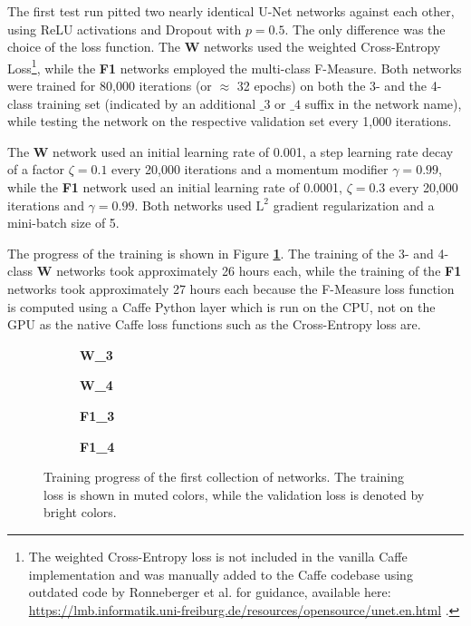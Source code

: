\noindent The first test run pitted two nearly identical U-Net networks against each other, using ReLU activations and Dropout with $p = 0.5$. The only difference was the choice of the loss function. The \textbf{W} networks used the weighted Cross-Entropy Loss\footnote{The weighted Cross-Entropy loss is not included in the vanilla Caffe implementation and was manually added to the Caffe codebase using outdated code by Ronneberger et al.  for guidance, available here: \url{https://lmb.informatik.uni-freiburg.de/resources/opensource/unet.en.html} .}, while the \textbf{F1} networks employed the multi-class F-Measure. Both networks were trained for 80,000 iterations (or $\approx$ 32 epochs) on both the 3- and the 4-class training set (indicated by an additional $\_3$ or $\_4$ suffix in the network name), while testing the network on the respective validation set every 1,000 iterations.

The \textbf{W} network used an initial learning rate of 0.001, a step learning rate decay of a factor $\zeta = 0.1$ every 20,000 iterations and a momentum modifier $\gamma = 0.99$, while the \textbf{F1} network used an initial learning rate of 0.0001, $\zeta = 0.3$ every 20,000 iterations and $\gamma = 0.99$. Both networks used $\text{L}^2$ gradient regularization and a mini-batch size of 5.

The progress of the training is shown in Figure \textbf{\ref{fig:weighted_f1_training}}. The training of the 3- and 4-class \textbf{W} networks took approximately 26 hours each, while the training of the \textbf{F1} networks took approximately 27 hours each because the F-Measure loss function is computed using a Caffe Python layer which is run on the CPU, not on the GPU as the native Caffe loss functions such as the Cross-Entropy loss are.\\

\begin {figure}[!htb]
	\begin {subfigure}[b]{0.4\linewidth}
		\scalebox{0.65}{}
		\caption{\textbf{W\_3}}
	\end {subfigure}\hspace{1.75cm}
	\begin {subfigure}[b]{0.4\linewidth}
		\scalebox{0.65}{}
		\caption{\textbf{W\_4}}
	\end {subfigure}

	\begin {subfigure}[b]{0.4\linewidth}
		\scalebox{0.65}{}
		\caption{\textbf{F1\_3}}
	\end {subfigure}\hspace{1.75cm}
	\begin {subfigure}[b]{0.4\linewidth}
		\scalebox{0.65}{}
		\caption{\textbf{F1\_4}}
	\end {subfigure}

		\caption[Training progress of the first collection of networks.]{Training progress of the first collection of networks. The training loss is shown in muted colors, while the validation loss is denoted by bright colors.}
		\label{fig:weighted_f1_training}
\end {figure}


